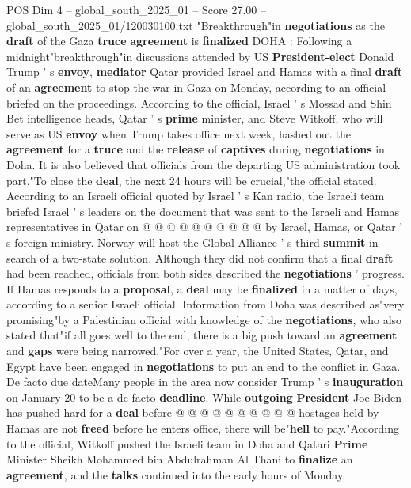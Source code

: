 \begin{textsample}{POS Dim 4 – global\_south\_2025\_01 – Score 27.00 – global\_south\_2025\_01/120030100.txt}  \label{ex:f4_pos_010}
"Breakthrough"in \textbf{negotiations} as the \textbf{draft} of the Gaza \textbf{truce} \textbf{agreement} is \textbf{finalized} DOHA : Following a midnight"breakthrough"in discussions attended by US \textbf{President-elect} Donald Trump ' s \textbf{envoy}, \textbf{mediator} Qatar provided Israel and Hamas with a final \textbf{draft} of an \textbf{agreement} to stop the war in Gaza on Monday, according to an official briefed on the proceedings.
According to the official, Israel ' s Mossad and Shin Bet intelligence heads, Qatar ' s \textbf{prime} minister, and Steve Witkoff, who will serve as US \textbf{envoy} when Trump takes office next week, hashed out the \textbf{agreement} for a \textbf{truce} and the \textbf{release} of \textbf{captives} during \textbf{negotiations} in Doha.
It is also believed that officials from the departing US administration took part."To close the \textbf{deal}, the next 24 hours will be crucial,"the official stated.
According to an Israeli official quoted by Israel ' s Kan radio, the Israeli team briefed Israel ' s leaders on the document that was sent to the Israeli and Hamas representatives in Qatar on @ @ @ @ @ @ @ @ @ @ by Israel, Hamas, or Qatar ' s foreign ministry.
Norway will host the Global Alliance ' s third \textbf{summit} in search of a two-state solution.
Although they did not confirm that a final \textbf{draft} had been reached, officials from both sides described the \textbf{negotiations} ' progress.
If Hamas responds to a \textbf{proposal}, a \textbf{deal} may be \textbf{finalized} in a matter of days, according to a senior Israeli official.
Information from Doha was described as"very promising"by a Palestinian official with knowledge of the \textbf{negotiations}, who also stated that"if all goes well to the end, there is a big push toward an \textbf{agreement} and \textbf{gaps} were being narrowed."For over a year, the United States, Qatar, and Egypt have been engaged in \textbf{negotiations} to put an end to the conflict in Gaza.
De facto due dateMany people in the area now consider Trump ' s \textbf{inauguration} on January 20 to be a de facto \textbf{deadline}.
While \textbf{outgoing} \textbf{President} Joe Biden has pushed hard for a \textbf{deal} before @ @ @ @ @ @ @ @ @ @ hostages held by Hamas are not \textbf{freed} before he enters office, there will be"\textbf{hell} to pay."According to the official, Witkoff pushed the Israeli team in Doha and Qatari \textbf{Prime} Minister Sheikh Mohammed bin Abdulrahman Al Thani to \textbf{finalize} an \textbf{agreement}, and the \textbf{talks} continued into the early hours of Monday.

\end{textsample}
